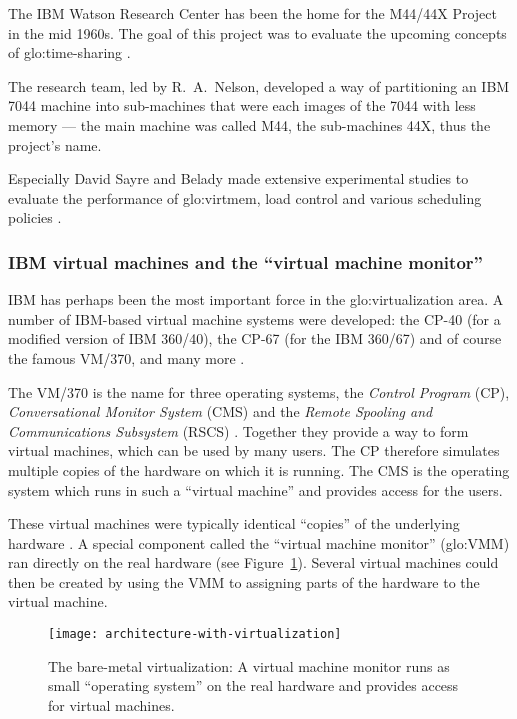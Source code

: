 The IBM Watson  Research Center has been the home  for the M44/44X Project
in the  mid 1960s. The goal of  this project was to  evaluate the upcoming
concepts of \gls{glo:time-sharing} \cite{denning81}.

The research team, led by R.~A.~Nelson, developed a way of partitioning an
IBM 7044 machine into sub-machines that  were each images of the 7044 with
less memory  --- the  main machine was  called M44, the  sub-machines 44X,
thus the project's name.

Especially David  Sayre and Belady made extensive  experimental studies to
evaluate the  performance of  \gls{glo:virtmem}, load control  and various
scheduling policies \cite{Belady66,denning81}.

\subsubsection{IBM virtual machines and the ``virtual machine monitor''}

IBM    has   perhaps   been    the   most    important   force    in   the
\gls{glo:virtualization}  area.   A number  of  IBM-based virtual  machine
systems were developed: the CP-40  (for a modified version of IBM 360/40),
the CP-67 (for  the IBM 360/67) and of course the  famous VM/370, and many
more \cite{creasy81,popek74}.

The  VM/370 is  the name  for three  operating systems,  the \emph{Control
  Program}  (CP),  \emph{Conversational  Monitor  System}  (CMS)  and  the
\emph{Remote Spooling and Communications Subsystem} (RSCS) \cite{creasy81}.
Together they provide a way to form virtual machines, which can be used by
many users. The CP therefore  simulates multiple copies of the hardware on
which it is running.  The CMS is the operating system which runs in such a
``virtual machine'' and provides access for the users.

These  virtual  machines  were   typically  identical  ``copies''  of  the
underlying  hardware  \cite{popek74}.   A  special  component  called  the
``virtual  machine  monitor'' (\gls{glo:VMM})  ran  directly  on the  real
hardware (see Figure~\ref{fig:arch-virt}).  Several virtual machines could
then be created by using the VMM to assigning parts of the hardware to the
virtual machine.

\begin{figure}[htbp]
  \centering
  \texttt{[image: architecture-with-virtualization]}
  \caption[Virtualization  architecture]{The bare-metal  virtualization: A
    virtual machine monitor runs as small ``operating system'' on the real
    hardware and provides access for virtual machines.}
  \label{fig:arch-virt}
\end{figure}

